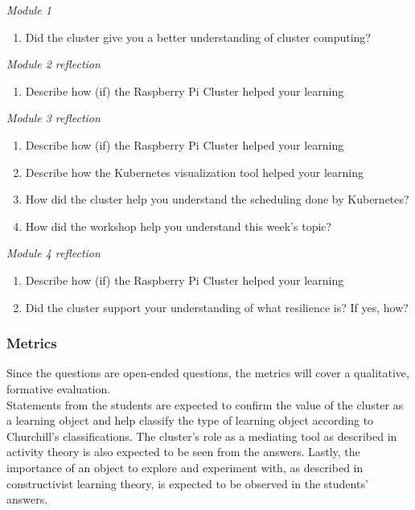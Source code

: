 \noindent
\textit{Module 1}
\begin{enumerate}
\setlength\itemsep{0.05em}
	\item Did the cluster give you a better understanding of cluster computing?
\end{enumerate}

\noindent
\textit{Module 2 reflection}
\begin{enumerate}
\setlength\itemsep{0.05em}
	\item Describe how (if) the Raspberry Pi Cluster helped your learning
\end{enumerate}

\noindent
\textit{Module 3 reflection}
\begin{enumerate}
\setlength\itemsep{0.05em}
	\item Describe how (if) the Raspberry Pi Cluster helped your learning
	\item Describe how the Kubernetes visualization tool helped your learning
	\item How did the cluster help you understand the scheduling done by Kubernetes?
	\item How did the workshop help you understand this week's topic? 
\end{enumerate}

\noindent
\textit{Module 4 reflection}
\begin{enumerate}
\setlength\itemsep{0.05em}
	\item Describe how (if) the Raspberry Pi Cluster helped your learning
	\item Did the cluster support your understanding of what resilience is? If yes, how?
\end{enumerate}


\subsubsection*{Metrics}
Since the questions are open-ended questions, the metrics will cover a qualitative, formative evaluation.
\\
Statements from the students are expected to confirm the value of the cluster as a learning object and help classify the type of learning object according to Churchill's classifications. The cluster's role as a mediating tool as described in activity theory is also expected to be seen from the answers. Lastly, the importance of an object to explore and experiment with, as described in constructivist learning theory, is expected to be observed in the students' answers.

